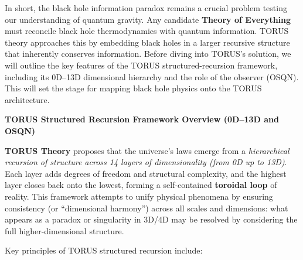 \documentclass[]{article}
\begin{document}
In short, the black hole information paradox remains a crucial problem
testing our understanding of quantum gravity. Any candidate
\textbf{Theory of Everything} must reconcile black hole thermodynamics
with quantum information. TORUS theory approaches this by embedding
black holes in a larger recursive structure that inherently conserves
information. Before diving into TORUS's solution, we will outline the
key features of the TORUS structured-recursion framework, including its
0D--13D dimensional hierarchy and the role of the observer (OSQN). This
will set the stage for mapping black hole physics onto the TORUS
architecture.

\textbf{TORUS Structured Recursion Framework Overview (0D--13D and
OSQN)}

\textbf{TORUS Theory} proposes that the universe's laws emerge from a
\emph{hierarchical recursion of structure across 14 layers of
dimensionality (from 0D up to 13D)}. Each layer adds degrees of freedom
and structural complexity, and the highest layer closes back onto the
lowest, forming a self-contained \textbf{toroidal loop} of reality. This
framework attempts to unify physical phenomena by ensuring consistency
(or ``dimensional harmony'') across all scales and dimensions: what
appears as a paradox or singularity in 3D/4D may be resolved by
considering the full higher-dimensional structure.

Key principles of TORUS structured recursion include:
\end{document}
